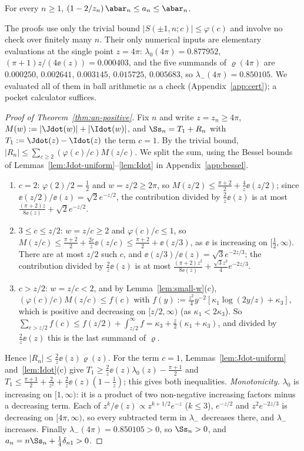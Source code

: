 \begin{theorem}\label{thm:an-bounds}
For every $n\ge1$, $(1-2/z_n)\,\abar_n\le a_n\le\abar_n$.
\end{theorem}

The proofs use only the trivial bound $|S(\pm1,n;c)|\le\varphi(c)$ and involve no check over finitely many $n$. Their only numerical inputs are
elementary evaluations at the single point $z=4\pi$: $\lambda_0(4\pi)=0.877952$, $(\pi+1)z/(4\ee(z))=0.000403$, and the five
summands of $\varrho(4\pi)$ are $0.000250$, $0.002641$, $0.003145$, $0.015725$, $0.005683$, so $\lambda_-(4\pi)=0.850105$. We evaluated all of them
in ball arithmetic as a check (Appendix~\ref{app:cert}); a pocket calculator suffices.

\begin{proof}[Proof of Theorem~\ref{thm:an-positive}]
Fix $n$ and write $z=z_n\ge4\pi$, $M(w):=|\Jdot(w)|+|\Idot(w)|$, and $\Ss_n=T_1+R_n$ with $T_1:=\Jdot(z)-\Idot(z)$ the term $c=1$. By the trivial
bound, $|R_n|\le\sum_{c\ge2}(\varphi(c)/c)M(z/c)$. We split the sum, using the Bessel bounds of Lemmas~\ref{lem:Jdot-uniform}--\ref{lem:Idot} in
Appendix~\ref{app:bessel}.
\begin{enumerate}[label=(\roman*)]
\item $c=2$: $\varphi(2)/2=\frac12$ and $w=z/2\ge2\pi$, so $M(z/2)\le\frac{\pi+2}2+\frac4z\ee(z/2)$; since $\ee(z/2)/\ee(z)=\sqrt2e^{-z/2}$, the contribution
divided by $\frac2z\ee(z)$ is at most $\frac{(\pi+2)z}{8\ee(z)}+\sqrt2e^{-z/2}$.
\item $3\le c\le z/2$: $w=z/c\ge2$ and $\varphi(c)/c\le1$, so $M(z/c)\le\frac{\pi+2}2+\frac{2c}z\ee(z/c)\le\frac{\pi+2}2+\ee(z/3)$, as $\ee$ is increasing on
$[\frac12,\infty)$. There are at most $z/2$ such $c$, and $\ee(z/3)/\ee(z)=\sqrt3e^{-2z/3}$; the contribution divided by $\frac2z\ee(z)$ is at most
$\frac{(\pi+2)z^2}{8\ee(z)}+\frac{\sqrt3z^2}4e^{-2z/3}$.
\item $c>z/2$: $w=z/c<2$, and by Lemma~\ref{lem:small-w}(c), $(\varphi(c)/c)M(z/c)\le f(c)$ with
$f(y):=\frac{z^2}4y^{-2}[\kappa_1\log(2y/z)+\kappa_3]$, which is positive and decreasing on $[z/2,\infty)$ (as $\kappa_1<2\kappa_3$). So
$\sum_{c>z/2}f(c)\le f(z/2)+\int_{z/2}^\infty f=\kappa_3+\frac z2(\kappa_1+\kappa_3)$, and divided by $\frac2z\ee(z)$ this is the last summand of $\varrho$.
\end{enumerate}
Hence $|R_n|\le\frac2z\ee(z)\varrho(z)$. For the term $c=1$, Lemmas~\ref{lem:Jdot-uniform} and~\ref{lem:Idot}(c) give
$T_1\ge\frac2z\ee(z)\lambda_0(z)-\frac{\pi+1}2$ and $T_1\le\frac{\pi+1}2+\frac2{z^2}+\frac2z\ee(z)(1-\frac1z)$; this gives both inequalities.
\emph{Monotonicity.} $\lambda_0$ is increasing on $[1,\infty)$: it is a product of two non-negative increasing factors minus a decreasing term.
Each of $z^k/\ee(z)\propto z^{k+1/2}e^{-z}$ ($k\le3$), $e^{-z/2}$ and $z^2e^{-2z/3}$ is decreasing on $[4\pi,\infty)$, so every subtracted term in
$\lambda_-$ decreases there, and $\lambda_-$ increases. Finally $\lambda_-(4\pi)=0.850105>0$, so $\Ss_n>0$, and $a_n=n\Ss_n+\frac14\delta_{n1}>0$.
\end{proof}

